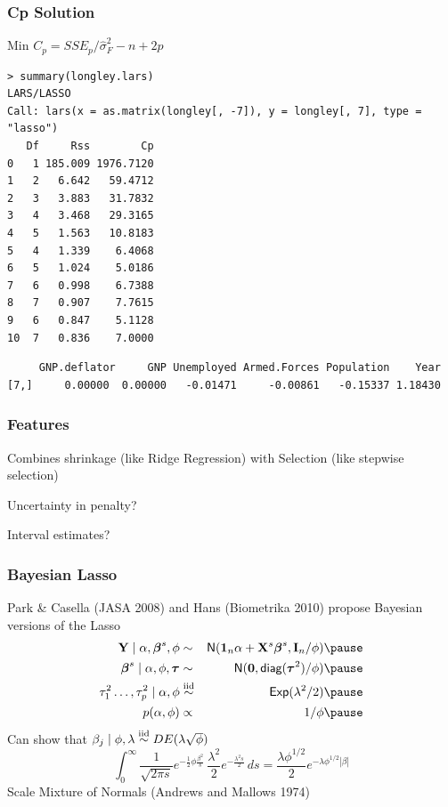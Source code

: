 \documentclass[]{beamer}
\begin{document}
\begin{frame}[fragile]
  \frametitle{Cp Solution}
Min $C_p = SSE_p/\hat{\sigma}^2_F - n + 2 p$  \pause
\begin{small}
\begin{verbatim}
> summary(longley.lars)
LARS/LASSO
Call: lars(x = as.matrix(longley[, -7]), y = longley[, 7], type = "lasso")
   Df     Rss        Cp
0   1 185.009 1976.7120
1   2   6.642   59.4712
2   3   3.883   31.7832
3   4   3.468   29.3165
4   5   1.563   10.8183
5   4   1.339    6.4068
6   5   1.024    5.0186
7   6   0.998    6.7388
8   7   0.907    7.7615
9   6   0.847    5.1128
10  7   0.836    7.0000
\end{verbatim}
\end{small}
 \pause
{\fontsize{9pt}{10pt} \selectfont
\begin{verbatim}
     GNP.deflator     GNP Unemployed Armed.Forces Population    Year
[7,]     0.00000  0.00000   -0.01471     -0.00861   -0.15337 1.18430

\end{verbatim}
}

\end{frame}
\begin{frame}
  \frametitle{Features}
Combines shrinkage (like Ridge Regression) with Selection (like
stepwise selection) \pause

\vspace{24pt}
Uncertainty  in  penalty? \pause

\vspace{24pt}
Interval estimates?
\end{frame}
\begin{frame}
  \frametitle{Bayesian Lasso}
  Park \& Casella (JASA 2008) and Hans (Biometrika 2010) propose
  Bayesian versions of the Lasso  \pause
  \begin{eqnarray*}
    \Y \mid \alpha, \b^s, \phi & \sim & \N(\one_n \alpha + \X^s \b^s, \I_n/\phi)  \pause\\
    \b^s \mid \alpha, \phi, \taub & \sim & \N(\zero, \diag(\taub^2)/\phi)  \pause\\
    \tau_1^2 \ldots, \tau_p^2 \mid \alpha, \phi & \simiid & \Ex(\lambda^2/2)  \pause\\
    p(\alpha, \phi) & \propto& 1/\phi  \pause\\
  \end{eqnarray*}
Can show that $\beta_j \mid \phi, \lambda \mathrel{\mathop{\sim}\limits^{\rm iid}} DE(\lambda \sqrt{\phi})$
$$\int_0^\infty \frac{1}{\sqrt{2 \pi s}}
  e^{-\frac{1}{2} \phi \frac{\beta^2}{s }}
  \, \frac{\lambda^2}{2} e^{- \frac{\lambda^2 s}{2}}\, ds =
  \frac{\lambda \phi^{1/2}}{2} e^{-\lambda \phi^{1/2} |\beta|}
$$  \pause
Scale Mixture of Normals  (Andrews and Mallows 1974)
\end{frame}
\end{document}
